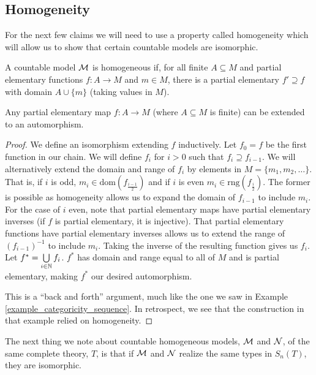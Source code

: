 \subsection{Homogeneity}

For the next few claims we will need to use a property called homogeneity which will allow us to show that certain countable models are isomorphic.

\begin{definition}\label{definition_homogeneity}
A countable model \(\mathcal{M}\) is homogeneous if, for all finite \(A \subseteq M\) and partial elementary functions \(f: A \to M\) and \(m \in M\), there is a partial elementary \(f' \supseteq f\) with domain \(A \cup \{m\}\) (taking values in \(M\)). 
\end{definition}

\begin{lemma}\label{theorem_partial_elementary_automorphism}
Any partial elementary map \(f: A \to M\) (where \(A \subseteq M\) is finite) can be extended to an automorphism. 
\end{lemma}

\begin{proof}
We define an isomorphism extending \(f\) inductively. 
Let \(f_0 = f\) be the first function in our chain.
We will define \(f_i\) for \(i > 0\) such that \(f_{i} \supseteq f_{i-1}\).
We will alternatively extend the domain and range of \(f_i\) by elements in \(M = \{m_1, m_2, \ldots\}\).
That is, if \(i\) is odd, \(m_i \in \text{dom}(f_{\frac{i-1}{2}})\) and if \(i\) is even \(m_i \in \text{rng}(f_{\frac{i}{2}})\).
The former is possible as homogeneity allows us to expand the domain of \(f_{i-1}\) to include \(m_i\).
For the case of \(i\) even, note that partial elementary maps have partial elementary inverses (if \(f\) is partial elementary, it is injective). 
That partial elementary functions have partial elementary inverses allows us to extend the range of \((f_{i-1})^{-1}\) to include \(m_i\). 
Taking the inverse of the resulting function gives us \(f_i\).
Let \(f^* = \bigcup\limits_{i \in \mathbb{N}}f_i\).
\(f^*\) has domain and range equal to all of \(M\) and is partial elementary, making \(f^*\) our desired automorphism.

This is a ``back and forth'' argument, much like the one we saw in Example \ref{example_categoricity_sequence}. 
In retrospect, we see that the construction in that example relied on homogeneity. 
\end{proof}

\begin{lemma}\label{lemma_types_isomorphism}
The next thing we note about countable homogeneous models, \(\mathcal{M}\) and \(\mathcal{N}\), of the same complete theory, \(T\), is that if \(\mathcal{M}\) and \(\mathcal{N}\) realize the same types in \(S_n(T)\), they are isomorphic.
\end{lemma}

